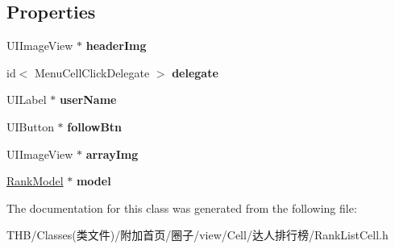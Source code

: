 \subsection*{Properties}
\begin{DoxyCompactItemize}
\item 
\mbox{\label{interface_rank_list_cell_a99e6a021221024c7930ee012af2f73c8}} 
U\+I\+Image\+View $\ast$ {\bfseries header\+Img}
\item 
\mbox{\label{interface_rank_list_cell_a109fa09be7e70d45d5222588f68819c6}} 
id$<$ Menu\+Cell\+Click\+Delegate $>$ {\bfseries delegate}
\item 
\mbox{\label{interface_rank_list_cell_ab2547e69092d3c9d95088ce2d73accf0}} 
U\+I\+Label $\ast$ {\bfseries user\+Name}
\item 
\mbox{\label{interface_rank_list_cell_a68e8ddfe4e19523d7fdf6e1bf83384ad}} 
U\+I\+Button $\ast$ {\bfseries follow\+Btn}
\item 
\mbox{\label{interface_rank_list_cell_a9e88f79660f4321f25fae5cb892ef42d}} 
U\+I\+Image\+View $\ast$ {\bfseries array\+Img}
\item 
\mbox{\label{interface_rank_list_cell_a4acfe3b36198109372cc9ffef48ecfa7}} 
\mbox{\hyperlink{interface_rank_model}{Rank\+Model}} $\ast$ {\bfseries model}
\end{DoxyCompactItemize}


The documentation for this class was generated from the following file\+:\begin{DoxyCompactItemize}
\item 
T\+H\+B/\+Classes(类文件)/附加首页/圈子/view/\+Cell/达人排行榜/Rank\+List\+Cell.\+h\end{DoxyCompactItemize}

